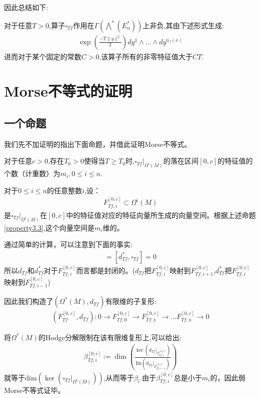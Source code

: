 因此总结如下:
\begin{proposition}
	对于任意$T>0$,算子$\square_{Tf}$作用在$\Gamma(\bigwedge^*(E_n^*))$上非负,其由下述形式生成:
	\begin{align}
		\exp(\frac{-T\|y\|^2}{2})dy^1\wedge \dots \wedge dy^{n_f(x)}
	\end{align}
	进而对于某个固定的常数$C>0$,该算子所有的非零特征值大于$CT$.
\end{proposition}
\section{Morse不等式的证明}
\subsection{一个命题}
我们先不加证明的指出下面命题，并借此证明Morse不等式。
\begin{proposition}\label{property3.3}
	对于任意$c>0$,存在$T_0>0$使得当$T\geq T_0$时,$\square_{Tf}|_{\Omega^i(M)}$的落在区间$[0,c]$的特征值的个数（计重数）为$m_i,0 \leq i \leq n$.
\end{proposition}


对于$0 \leq i \leq n$的任意整数$i$,设：
\begin{align*}
	F_{Tf,i}^{[0,c]}\subset \Omega^i(M)
\end{align*}
是$\square_{Tf}|_{\Omega^i(M)}$在$[0,c]$中的特征值对应的特征向量所生成的向量空间。根据上述命题\ref{property3.3},这个向量空间是$m_i$维的。

通过简单的计算，可以注意到下面的事实:
\begin{align*}
	[d_{Tf},\square_{Tf}]=[d^*_{Tf},\square_{Tf}]=0
\end{align*}
所以$d_{Tf}$和$d_{Tf}^*$对于$F_{Tf,i}^{[0,c]}$而言都是封闭的。($d_{Tf}$把$F_{Tf,i}^{[0,c]}$映射到$F_{Tf,i+1}^{[0,c]}$,$d^*_{Tf}$把$F_{Tf,i}^{[0,c]}$映射到$F_{Tf,i-1}^{[0,c]}$)

因此我们构造了$(\Omega^*(M),d_{Tf})$有限维的子复形:
\begin{align}
	(F_{Tf}^{[0,c]},d_{Tf}):0 \longrightarrow F_{Tf,0}^{[0,c]} \longrightarrow F_{Tf,1}^{[0,c]} \longrightarrow \dots F_{Tf,n}^{[0,c]} \longrightarrow 0
\end{align}

将$\Omega^*(M)$的Hodge分解限制在该有限维复形上,可以给出:
\begin{align}
	\beta_{Tf,i}^{[0,c]}:=\dim (\frac{\ker(d_{Tf}|_{F_{Tf,i}^{[0,c]}})}{\mathrm{Im}(d_{Tf}|_{F_{Tf,{i-1}}^{[0,c]}})})
\end{align}
就等于$\mathrm{dim}(\ker(\square_{Tf}|_{\Omega^i(M)}))$,从而等于$\beta_i$.由于$\beta_{Tf,i}^{[0,c]}$总是小于$m_i$的，因此弱Morse不等式证毕。

